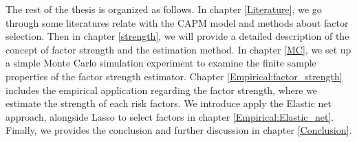 The rest of the thesis is organized as follows.
In chapter \ref{Literature}, we go through some literatures relate with the CAPM model and methods about factor selection.
Then in chapter \ref{strength}, we will provide a detailed description of the concept of factor strength and the estimation method.
In chapter \ref{MC}, we set up a simple Monte Carlo simulation experiment to examine the finite sample properties of the factor strength estimator.
Chapter \ref{Empirical:factor_strength} includes the empirical application regarding the factor strength, where we estimate the strength of each risk factors.
We introduce apply the Elastic net approach, alongside Lasso to select factors in chapter \ref{Empirical:Elastic_net}.
Finally, we provides the conclusion and further discussion in chapter \ref{Conclusion}.





